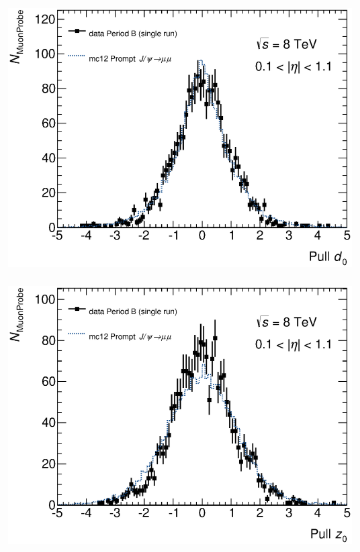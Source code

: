 \begin{figure}[htbp]
    \begin{subfigure}[b]{0.49\textwidth}
      \includegraphics[width=\textwidth]{PartCalibration2012/Plots/DiscrepancyStudy/Pull/h_pull_d0_Nominal.eps}
      \caption{}\label{fig:CalibrationPullD0}
    \end{subfigure}
    \hfill
    \begin{subfigure}[b]{0.49\textwidth}
      \includegraphics[width=\textwidth]{PartCalibration2012/Plots/DiscrepancyStudy/Pull/h_pull_z0_Nominal.eps}
      \caption{}\label{fig:CalibrationPullZ0}
    \end{subfigure}


\end{figure}
